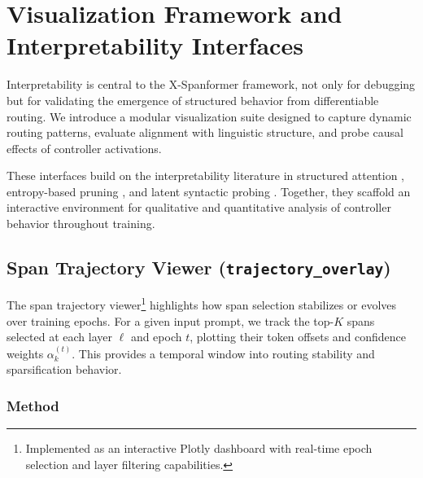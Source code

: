 \section{Visualization Framework and Interpretability Interfaces}
\label{sec:visualizations}

Interpretability is central to the X-Spanformer framework, not only for debugging but for validating the emergence of structured behavior from differentiable routing. We introduce a modular visualization suite designed to capture dynamic routing patterns, evaluate alignment with linguistic structure, and probe causal effects of controller activations.

These interfaces build on the interpretability literature in structured attention \cite{vig2019analyzing, hoover2020exbert}, entropy-based pruning \cite{grandvalet2006entropy, pereyra2017regularizing}, and latent syntactic probing \cite{linzen2016assessing, kim2019unsupervised}. Together, they scaffold an interactive environment for qualitative and quantitative analysis of controller behavior throughout training.

\subsection{Span Trajectory Viewer (\texttt{trajectory\_overlay})}
\label{sec:vis-traj}

The span trajectory viewer\footnote{Implemented as an interactive Plotly dashboard with real-time epoch selection and layer filtering capabilities.} highlights how span selection stabilizes or evolves over training epochs. For a given input prompt, we track the top-$K$ spans selected at each layer \( \ell \) and epoch \( t \), plotting their token offsets and confidence weights \( \alpha_k^{(t)} \). This provides a temporal window into routing stability and sparsification behavior.

\subsubsection*{Method}

